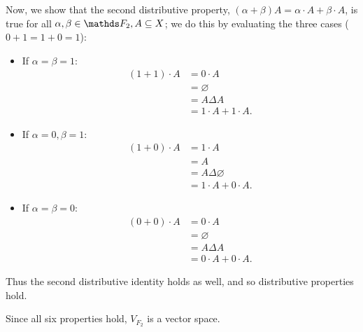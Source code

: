 \documentclass{homework}
\begin{document}
\begin{solution}
\begin{itemize}
    Now, we show that the second distributive property, $\left( \alpha+ \beta \right) A =
    \alpha\cdot A+\beta\cdot A$, is true for all $\alpha,\beta\in \F_2,A\subseteq X$; we do this by
    evaluating the three cases ($0+ 1=1+ 0=1$):
    \begin{itemize}
      \item If $\alpha=\beta=1$:
        \begin{align*}
          (1+ 1)\cdot A &= 0\cdot A \\
          &= \varnothing \\
          &= A\Delta A \\
          &= 1\cdot A+1\cdot A
        .\end{align*}
      \item If $\alpha=0,\beta=1$:
        \begin{align*}
          (1+0)\cdot A&= 1\cdot A \\
          &= A \\
          &= A\Delta\varnothing \\
          &= 1\cdot A+0\cdot A
        .\end{align*}
      \item If $\alpha=\beta=0$:
        \begin{align*}
          (0+0)\cdot A&= 0\cdot A \\
          &= \varnothing \\
          &= A\Delta A \\
          &= 0\cdot A+0\cdot A
        .\end{align*}
    \end{itemize}
    Thus the second distributive identity holds as well, and so distributive properties hold.

  \end{itemize}
  Since all six properties hold, $V_{F_2}$ is a vector space.
\end{solution}
\end{document}
